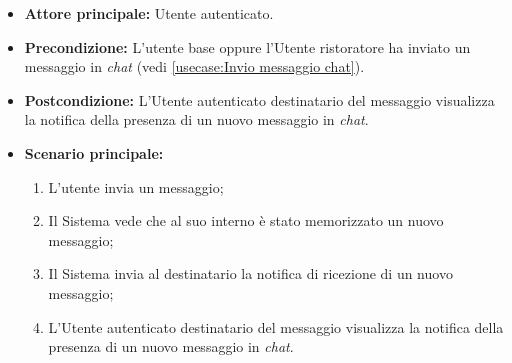 \label{usecase:Visualizzazione notifica nuovo messaggio in chat}
\begin{itemize}
    \item \textbf{Attore principale:} Utente autenticato.
	
	\item \textbf{Precondizione:} L'utente base oppure l'Utente ristoratore ha inviato un messaggio in \textit{chat} (vedi \autoref{usecase:Invio messaggio chat}).

	\item \textbf{Postcondizione:} L'Utente autenticato destinatario del messaggio visualizza la notifica della presenza di un nuovo messaggio in \textit{chat}.
     
	\item \textbf{Scenario principale:}
	      \begin{enumerate}
                \item L'utente invia un messaggio;
                \item Il Sistema vede che al suo interno è stato memorizzato un nuovo messaggio;
                \item Il Sistema invia al destinatario la notifica di ricezione di un nuovo messaggio;
                \item L'Utente autenticato destinatario del messaggio visualizza la notifica della presenza di un nuovo messaggio in \textit{chat}.
	      \end{enumerate}
\end{itemize}